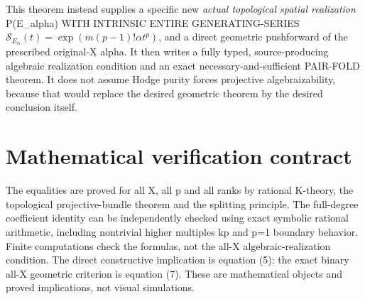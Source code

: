 \documentclass[11pt]{article}
\begin{document}
This theorem instead supplies a specific new
\emph{actual topological spatial realization}
P(E_alpha) WITH INTRINSIC ENTIRE GENERATING-SERIES
\(\mathcal S_{E_\alpha}(t)=
 \exp(m(p-1)!\alpha t^p)\), and a direct geometric
pushforward of the prescribed original-X alpha.
It then writes a fully typed, source-producing
algebraic realization condition and an exact
necessary-and-sufficient PAIR-FOLD theorem.
It does not assume Hodge purity forces
projective algebraizability, because that
would replace the desired geometric theorem
by the desired conclusion itself.

\section{Mathematical verification contract}
The equalities are proved for all X, all p and
all ranks by rational K-theory, the topological
projective-bundle theorem and the splitting
principle. The full-degree coefficient identity
can be independently checked using exact
symbolic rational arithmetic, including nontrivial
higher multiples kp and p=1 boundary behavior.
Finite computations check the formulas, not
the all-X algebraic-realization condition.
The direct constructive implication is equation
(5); the exact binary all-X geometric
criterion is equation (7). These are mathematical
objects and proved implications, not visual
simulations.
\end{document}
